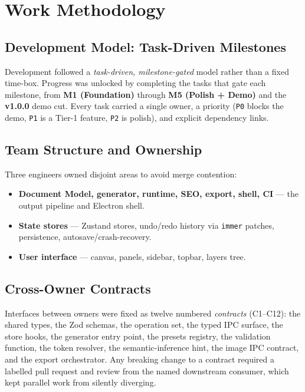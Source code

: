 
\chapter{Work Methodology}
\label{ch:methodology}

\section{Development Model: Task-Driven Milestones}
Development followed a \emph{task-driven, milestone-gated} model rather than a
fixed time-box. Progress was unlocked by completing the tasks that gate each
milestone, from \textbf{M1 (Foundation)} through \textbf{M5 (Polish + Demo)} and
the \textbf{v1.0.0} demo cut. Every task carried a single owner, a priority
(\texttt{P0} blocks the demo, \texttt{P1} is a Tier-1 feature, \texttt{P2} is
polish), and explicit dependency links.

\section{Team Structure and Ownership}
Three engineers owned disjoint areas to avoid merge contention:
\begin{itemize}[leftmargin=1.5em]
  \item \textbf{Document Model, generator, runtime, SEO, export, shell, CI} ---
        the output pipeline and Electron shell.
  \item \textbf{State stores} --- Zustand stores, undo/redo history via
        \texttt{immer} patches, persistence, autosave/crash-recovery.
  \item \textbf{User interface} --- canvas, panels, sidebar, topbar, layers tree.
\end{itemize}

\section{Cross-Owner Contracts}
Interfaces between owners were fixed as twelve numbered \emph{contracts}
(C1--C12): the shared types, the Zod schemas, the operation set, the typed IPC
surface, the store hooks, the generator entry point, the presets registry, the
validation function, the token resolver, the semantic-inference hint, the image
IPC contract, and the export orchestrator. Any breaking change to a contract
required a labelled pull request and review from the named downstream consumer,
which kept parallel work from silently diverging.

